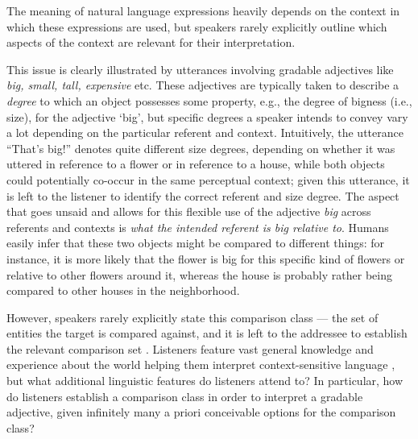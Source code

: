 The meaning of natural language expressions heavily depends on the context in which these expressions are used, but speakers rarely explicitly outline which aspects of the context are relevant for their interpretation. 

This issue is clearly illustrated by utterances involving gradable adjectives like \textit{big, small, tall, expensive} etc. These adjectives are typically taken to describe a \emph{degree} to which an object possesses some property, e.g., the degree of bigness (i.e., size), for the adjective ‘big’, but specific degrees a speaker intends to convey vary a lot depending on the particular referent and context. Intuitively, the utterance “That’s big!” denotes quite different size degrees, depending on whether it was uttered in reference to a flower or in reference to a house, while both objects could potentially co-occur in the same perceptual context; given this utterance, it is left to the listener to identify the correct referent and size degree. The aspect that goes unsaid and allows for this flexible use of the adjective \textit{big} across referents and contexts is \textit{what the intended referent is big relative to}. Humans easily infer that these two objects might be compared to different things: for instance, it is more likely that the flower is big for this specific kind of flowers or relative to other flowers around it, whereas the house is probably rather being compared to other houses in the neighborhood. 

However, speakers rarely explicitly state this comparison class --- the set of entities the target is compared against, and it is left to the addressee to establish the relevant comparison set \parencite{Solt2009}. Listeners feature vast general knowledge and experience about the world helping them interpret context-sensitive language \parencite{tessler2017warm}, but what additional linguistic features do listeners attend to? In particular, how do listeners establish a comparison class in order to interpret a gradable adjective, given infinitely many a priori conceivable options for the comparison class? 

